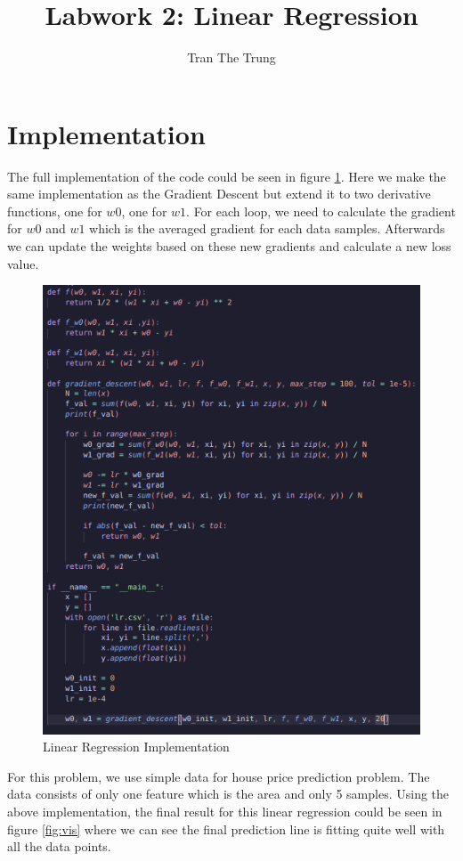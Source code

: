 \documentclass{article}
\title{Labwork 2: Linear Regression}
\author{Tran The Trung}
\begin{document}
\maketitle

\section{Implementation}
The full implementation of the code could be seen in figure \ref{fig:code}. Here we make the same implementation as the Gradient Descent but extend it to two derivative functions, one for $w0$, one for $w1$. For each loop, we need to calculate the gradient for $w0$ and $w1$ which is the averaged gradient for each data samples. Afterwards we can update the weights based on these new gradients and calculate a new loss value.

\begin{figure}[H]
    \centering
    \includegraphics[width=0.68\linewidth]{image/code.png}
    \caption{Linear Regression Implementation}
    \label{fig:code}
\end{figure}

For this problem, we use simple data for house price prediction problem. The data consists of only one feature which is the area and only 5 samples. Using the above implementation, the final result for this linear regression could be seen in figure \ref{fig:vis} where we can see the final prediction line is fitting quite well with all the data points.
\end{document}
